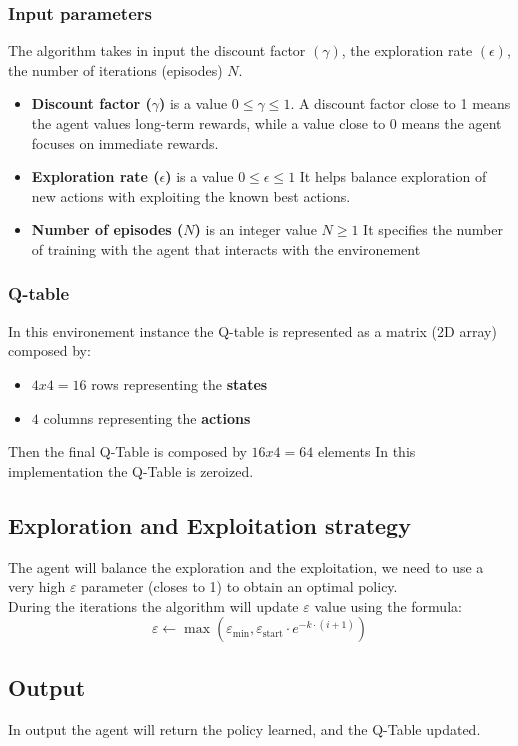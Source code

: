 \subsubsection{Input parameters}
The algorithm takes in input the discount factor $(\gamma)$, the exploration rate $(\epsilon)$, the number of iterations (episodes) $N$.
\begin{itemize}
    \item \textbf{Discount factor ($\gamma$)} is a value  $ 0 \leq  \gamma \leq 1$. A discount factor close to 1 means the agent values long-term rewards, while a value close to 0 means the agent focuses on immediate rewards.
    \item \textbf{Exploration rate ($\epsilon$)} is a value  $ 0 \leq  \epsilon \leq 1 $ It helps balance exploration of new actions with exploiting the known best actions.
    \item \textbf{Number of episodes ($N$)} is an integer value  $ N \ge 1 $ It specifies the number of training with the agent that interacts with the environement
\end{itemize}
\subsubsection{Q-table}
In this environement instance the Q-table is represented as a matrix (2D array) composed by:
\begin{itemize}
    \item $4x4=16$ rows representing the \textbf{states}
    \item $4$ columns representing the \textbf{actions}
\end{itemize}
Then the final Q-Table is composed by $16x4=64$ elements
In this implementation the Q-Table is zeroized.
\subsection{Exploration and Exploitation strategy}
The agent will balance the exploration and the exploitation, we need to use a very high $\varepsilon$ parameter (closes to 1) to obtain an optimal policy.\\
During the iterations the algorithm will update $\varepsilon$ value using the formula:
\begin{equation}
    \label{exponential_decay}
    \varepsilon \leftarrow \max\left(\varepsilon_{\text{min}}, \varepsilon_{\text{start}} \cdot e^{-k \cdot (i+1)}\right)
\end{equation}
\subsection{Output}
In output the agent will return the policy learned, and the Q-Table updated.
